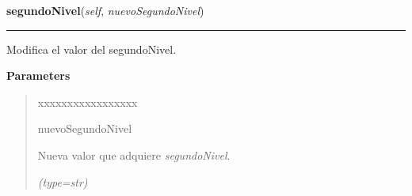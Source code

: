     \label{grafo:Grafo:segundoNivel}

    \vspace{0.5ex}

\hspace{.8\funcindent}\begin{boxedminipage}{\funcwidth}

    \raggedright \textbf{segundoNivel}(\textit{self}, \textit{nuevoSegundoNivel})

    \vspace{-1.5ex}

    \rule{\textwidth}{0.5\fboxrule}
\setlength{\parskip}{2ex}
    Modifica el valor del segundoNivel.

\setlength{\parskip}{1ex}
      \textbf{Parameters}
      \vspace{-1ex}

      \begin{quote}
        \begin{Ventry}{xxxxxxxxxxxxxxxxx}

          \item[nuevoSegundoNivel]

          Nueva valor que adquiere \textit{segundoNivel}.

            {\it (type=str)}

        \end{Ventry}

      \end{quote}

    \end{boxedminipage}

    \label{grafo:Grafo:setNumeroAlgunasCategorias}

    \vspace{0.5ex}

